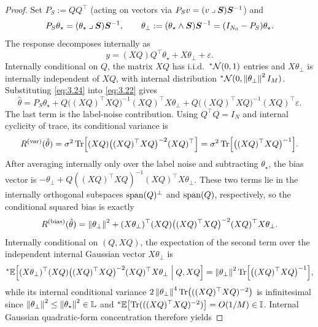 \begin{proof}
Set $P_S := QQ^\top$ (acting on vectors via $P_S v = (v \mathbin{\lrcorner} \bm{S})\bm{S}^{-1}$) and
\begin{equation}\label{eq:3.23}
P_S\theta_\star = (\theta_\star \mathbin{\lrcorner} \bm{S})\bm{S}^{-1}, \qquad \theta_\perp := (\theta_\star \wedge \bm{S})\bm{S}^{-1} = (I_{N_0} - P_S)\theta_\star.
\end{equation}
The response decomposes internally as
\begin{equation}\label{eq:3.24}
y = (XQ)Q^\top \theta_\star + X\theta_\perp + \varepsilon.
\end{equation}
Internally conditional on $Q$, the matrix $XQ$ has i.i.d.\ ${}^*\mathcal{N}(0, 1)$ entries and $X\theta_\perp$ is internally independent of $XQ$, with internal distribution ${}^*\mathcal{N}(0, \left\lVert \theta_\perp \right\rVert^2 I_M)$. Substituting \eqref{eq:3.24} into \eqref{eq:3.22} gives
\begin{equation}\label{eq:3.25}
\hat{\theta} = P_S\theta_\star + Q\bigl((XQ)^\top XQ\bigr)^{-1}(XQ)^\top X\theta_\perp + Q\bigl((XQ)^\top XQ\bigr)^{-1}(XQ)^\top \varepsilon.
\end{equation}
The last term is the label-noise contribution. Using $Q^\top Q = I_N$ and internal cyclicity of trace, its conditional variance is
\begin{equation}\label{eq:3.26}
R^{(\mathrm{var})}(\hat{\theta}) = \sigma^2 \operatorname{Tr}\Bigl[(XQ)\bigl((XQ)^\top XQ\bigr)^{-2}(XQ)^\top\Bigr] = \sigma^2 \operatorname{Tr}\Bigl[\bigl((XQ)^\top XQ\bigr)^{-1}\Bigr].
\end{equation}
After averaging internally only over the label noise and subtracting $\theta_\star$, the bias vector is $-\theta_\perp + Q((XQ)^\top XQ)^{-1}(XQ)^\top X\theta_\perp$. These two terms lie in the internally orthogonal subspaces $\operatorname{span}(Q)^\perp$ and $\operatorname{span}(Q)$, respectively, so the conditional squared bias is exactly
\begin{equation}\label{eq:3.27}
R^{(\mathrm{bias})}(\hat{\theta}) = \left\lVert \theta_\perp \right\rVert^2 + (X\theta_\perp)^\top (XQ)\bigl((XQ)^\top XQ\bigr)^{-2}(XQ)^\top X\theta_\perp.
\end{equation}
Internally conditional on $(Q, XQ)$, the expectation of the second term over the independent internal Gaussian vector $X\theta_\perp$ is
\begin{equation}\label{eq:3.28}
{}^*\mathbb{E}\Bigl[(X\theta_\perp)^\top (XQ)\bigl((XQ)^\top XQ\bigr)^{-2}(XQ)^\top X\theta_\perp \;\Big|\; Q, XQ\Bigr] = \left\lVert \theta_\perp \right\rVert^2 \operatorname{Tr}\Bigl[\bigl((XQ)^\top XQ\bigr)^{-1}\Bigr],
\end{equation}
while its internal conditional variance $2\left\lVert \theta_\perp \right\rVert^4 \operatorname{Tr}\bigl(((XQ)^\top XQ)^{-2}\bigr)$ is infinitesimal since $\left\lVert \theta_\perp \right\rVert^2 \le \left\lVert \theta_\star \right\rVert^2 \in \mathbb{L}$ and ${}^*\mathbb{E}\bigl[\operatorname{Tr}(((XQ)^\top XQ)^{-2})\bigr] = O(1/M) \in \mathbb{I}$. Internal Gaussian quadratic-form concentration therefore yields

\end{proof}
